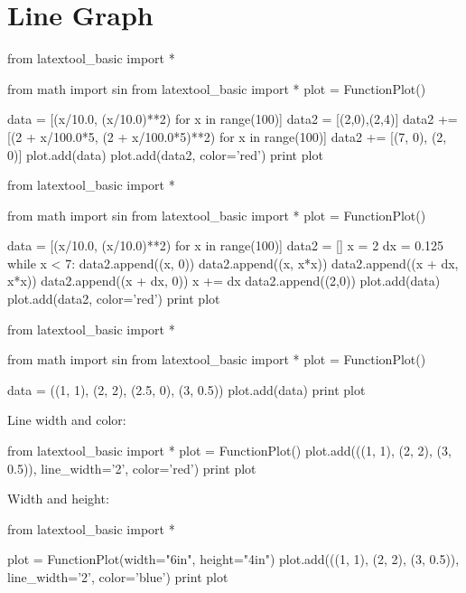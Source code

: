 \section{Line Graph}

\begin{python}
from latextool_basic import *

from math import sin
from latextool_basic import *
plot = FunctionPlot()

data = [(x/10.0, (x/10.0)**2) for x in range(100)]
data2 = [(2,0),(2,4)]
data2 += [(2 + x/100.0*5, (2 + x/100.0*5)**2) for x in range(100)]
data2 += [(7, 0), (2, 0)]
plot.add(data)
plot.add(data2, color='red')
print plot
\end{python}


\begin{python}
from latextool_basic import *

from math import sin
from latextool_basic import *
plot = FunctionPlot()

data = [(x/10.0, (x/10.0)**2) for x in range(100)]
data2 = []
x = 2
dx = 0.125
while x < 7:
    data2.append((x, 0))
    data2.append((x, x*x))
    data2.append((x + dx, x*x))
    data2.append((x + dx, 0))
    x += dx
data2.append((2,0))
plot.add(data)
plot.add(data2, color='red')
print plot
\end{python}



\begin{python}
from latextool_basic import *

from math import sin
from latextool_basic import *
plot = FunctionPlot()

data = ((1, 1), (2, 2), (2.5, 0), (3, 0.5))
plot.add(data)
print plot
\end{python}


\newpage
Line width and color:

\begin{python}
from latextool_basic import *
plot = FunctionPlot()
plot.add(((1, 1), (2, 2), (3, 0.5)), line_width='2', color='red')
print plot
\end{python}


\newpage

Width and height:

\begin{python}
from latextool_basic import *

plot = FunctionPlot(width="6in", height="4in")
plot.add(((1, 1), (2, 2), (3, 0.5)), line_width='2', color='blue')
print plot
\end{python}


